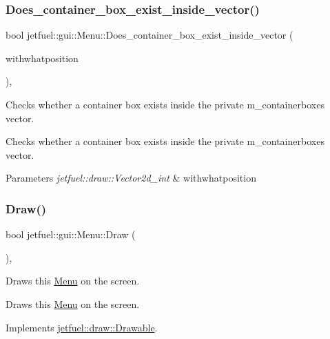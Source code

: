 \subsubsection{\texorpdfstring{Does\+\_\+container\+\_\+box\+\_\+exist\+\_\+inside\+\_\+vector()}{Does\_container\_box\_exist\_inside\_vector()}}
{\footnotesize\ttfamily bool jetfuel\+::gui\+::\+Menu\+::\+Does\+\_\+container\+\_\+box\+\_\+exist\+\_\+inside\+\_\+vector (\begin{DoxyParamCaption}\item[{const \hyperlink{classjetfuel_1_1draw_1_1Vector2d}{jetfuel\+::draw\+::\+Vector2d\+\_\+int}}]{withwhatposition }\end{DoxyParamCaption})\hspace{0.3cm}{\ttfamily [inline]}, {\ttfamily [protected]}}



Checks whether a container box exists inside the private m\+\_\+containerboxes vector. 

Checks whether a container box exists inside the private m\+\_\+containerboxes vector.


\begin{DoxyParams}{Parameters}
{\em jetfuel\+::draw\+::\+Vector2d\+\_\+int} & withwhatposition \\
\hline
\end{DoxyParams}
\mbox{\label{classjetfuel_1_1gui_1_1Menu_a0355f5ee3060b1ae9d85a5c8cba3795b}} 
\subsubsection{\texorpdfstring{Draw()}{Draw()}}
{\footnotesize\ttfamily bool jetfuel\+::gui\+::\+Menu\+::\+Draw (\begin{DoxyParamCaption}{ }\end{DoxyParamCaption})\hspace{0.3cm}{\ttfamily [override]}, {\ttfamily [virtual]}}



Draws this \hyperlink{classjetfuel_1_1gui_1_1Menu}{Menu} on the screen. 

Draws this \hyperlink{classjetfuel_1_1gui_1_1Menu}{Menu} on the screen. 

Implements \hyperlink{classjetfuel_1_1draw_1_1Drawable_a1a072070322965ce9411ee6e7c311c56}{jetfuel\+::draw\+::\+Drawable}.


